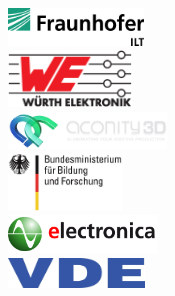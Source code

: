 \documentclass[a4paper,12pt,notumble]{leaflet}
\begin{document}
\begin{center}
\includegraphics[height= 1cm]{../Logos/ILT.png} \\ \vspace{0.3cm}
\includegraphics[height= 1.5cm]{../Logos/Wuerth.png} \\ \vspace{0.3cm}
\includegraphics[height= 1cm]{../Logos/aconity.png} \\ \vspace{0.3cm}
\includegraphics[height= 1.5cm]{../Logos/BMBF.jpg} \\ \vspace{0.3cm}
\includegraphics[height= 1cm]{../Logos/electronica.png} \\ \vspace{0.3cm}
\includegraphics[height= 0.8cm]{../Logos/VDE.jpg}
\end{center}
\end{document}
